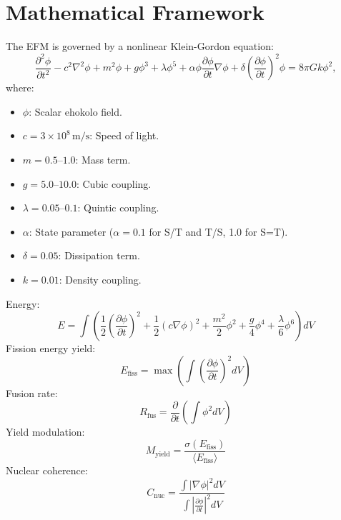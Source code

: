 \documentclass[11pt]{article}
\begin{document}
\section{Mathematical Framework}
The EFM is governed by a nonlinear Klein-Gordon equation:
\begin{equation}
\frac{\partial^2 \phi}{\partial t^2} - c^2 \nabla^2 \phi + m^2 \phi + g \phi^3 + \lambda \phi^5 + \alpha \phi \frac{\partial \phi}{\partial t} \nabla \phi + \delta \left(\frac{\partial \phi}{\partial t}\right)^2 \phi = 8\pi G k \phi^2,
\end{equation}
where:
\begin{itemize}
    \item \(\phi\): Scalar ehokolo field.
    \item \(c = 3 \times 10^8 \, \text{m/s}\): Speed of light.
    \item \(m = 0.5–1.0\): Mass term.
    \item \(g = 5.0–10.0\): Cubic coupling.
    \item \(\lambda = 0.05–0.1\): Quintic coupling.
    \item \(\alpha\): State parameter (\(\alpha = 0.1\) for S/T and T/S, 1.0 for S=T).
    \item \(\delta = 0.05\): Dissipation term.
    \item \(k = 0.01\): Density coupling.
\end{itemize}
Energy:
\begin{equation}
E = \int \left( \frac{1}{2} \left(\frac{\partial \phi}{\partial t}\right)^2 + \frac{1}{2} (c \nabla \phi)^2 + \frac{m^2}{2} \phi^2 + \frac{g}{4} \phi^4 + \frac{\lambda}{6} \phi^6 \right) dV
\end{equation}
Fission energy yield:
\begin{equation}
E_{\text{fiss}} = \max \left( \int \left(\frac{\partial \phi}{\partial t}\right)^2 dV \right)
\end{equation}
Fusion rate:
\begin{equation}
R_{\text{fus}} = \frac{\partial}{\partial t} \left( \int \phi^2 dV \right)
\end{equation}
Yield modulation:
\begin{equation}
M_{\text{yield}} = \frac{\sigma(E_{\text{fiss}})}{\langle E_{\text{fiss}} \rangle}
\end{equation}
Nuclear coherence:
\begin{equation}
C_{\text{nuc}} = \frac{\int |\nabla \phi|^2 dV}{\int \left| \frac{\partial \phi}{\partial t} \right|^2 dV}
\end{equation}
\end{document}
